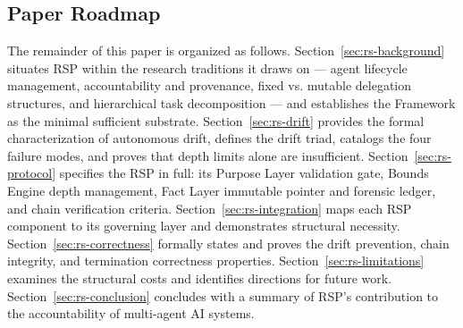 \subsection{Paper Roadmap}
\label{sec:rs-intro-roadmap}

The remainder of this paper is organized as follows. Section~\ref{sec:rs-background} situates RSP within the research traditions it draws on — agent lifecycle management, accountability and provenance, fixed vs. mutable delegation structures, and hierarchical task decomposition — and establishes the \bxthree{} Framework as the minimal sufficient substrate. Section~\ref{sec:rs-drift} provides the formal characterization of autonomous drift, defines the drift triad, catalogs the four failure modes, and proves that depth limits alone are insufficient. Section~\ref{sec:rs-protocol} specifies the RSP in full: its Purpose Layer validation gate, Bounds Engine depth management, Fact Layer immutable pointer and forensic ledger, and chain verification criteria. Section~\ref{sec:rs-integration} maps each RSP component to its governing \bxthree{} layer and demonstrates structural necessity. Section~\ref{sec:rs-correctness} formally states and proves the drift prevention, chain integrity, and termination correctness properties. Section~\ref{sec:rs-limitations} examines the structural costs and identifies directions for future work. Section~\ref{sec:rs-conclusion} concludes with a summary of RSP's contribution to the accountability of multi-agent AI systems.
